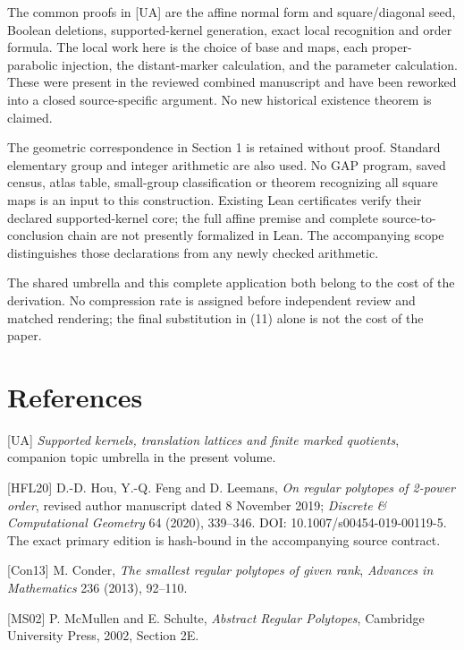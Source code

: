 The common proofs in {[}UA{]} are the affine normal form and
square/diagonal seed, Boolean deletions, supported-kernel generation,
exact local recognition and order formula. The local work here is the
choice of base and maps, each proper-parabolic injection, the
distant-marker calculation, and the parameter calculation. These were
present in the reviewed combined manuscript and have been reworked into
a closed source-specific argument. No new historical existence theorem
is claimed.

The geometric correspondence in Section 1 is retained without proof.
Standard elementary group and integer arithmetic are also used. No GAP
program, saved census, atlas table, small-group classification or
theorem recognizing all square maps is an input to this construction.
Existing Lean certificates verify their declared supported-kernel core;
the full affine premise and complete source-to-conclusion chain are not
presently formalized in Lean. The accompanying scope distinguishes those
declarations from any newly checked arithmetic.

The shared umbrella and this complete application both belong to the
cost of the derivation. No compression rate is assigned before
independent review and matched rendering; the final substitution in (11)
alone is not the cost of the paper.

\section*{References}
{[}UA{]} \emph{Supported kernels, translation lattices and finite marked quotients},
companion topic umbrella in the present volume.

{[}HFL20{]} D.-D. Hou, Y.-Q. Feng and D. Leemans, \emph{On regular
polytopes of 2-power order}, revised author manuscript dated 8 November
2019; \emph{Discrete \& Computational Geometry} 64 (2020), 339--346.
DOI: 10.1007/s00454-019-00119-5. The exact primary edition is hash-bound
in the accompanying source contract.

{[}Con13{]} M. Conder, \emph{The smallest regular polytopes of given
rank}, \emph{Advances in Mathematics} 236 (2013), 92--110.

{[}MS02{]} P. McMullen and E. Schulte, \emph{Abstract Regular
Polytopes}, Cambridge University Press, 2002, Section 2E.

